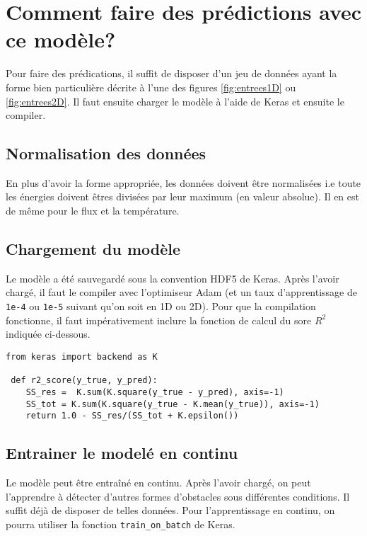 

\chapter{Comment faire des prédictions avec ce modèle?} %

\label{AppendixB} %
Pour faire des prédications, il suffit de disposer d'un jeu de données ayant la forme bien particulière décrite à l'une des figures \ref{fig:entrees1D} ou \ref{fig:entrees2D}. Il faut ensuite charger le modèle à l'aide de Keras et ensuite le compiler.

\section{Normalisation des données}
En plus d'avoir la forme appropriée, les données doivent être normalisées i.e toute les énergies doivent êtres divisées par leur maximum (en valeur absolue). Il en est de même pour le flux et la température.

\section{Chargement du modèle}
Le modèle a été sauvegardé sous la convention HDF5 de Keras. Après l'avoir chargé, il faut le compiler avec l'optimiseur Adam (et un taux d'apprentissage de \verb|1e-4| ou \verb|1e-5| suivant qu'on soit en 1D ou 2D). Pour que la compilation fonctionne, il faut impérativement inclure la fonction de calcul du sore $R^2$ indiquée ci-dessous.

\begin{verbatim}
from keras import backend as K

 def r2_score(y_true, y_pred):
    SS_res =  K.sum(K.square(y_true - y_pred), axis=-1) 
    SS_tot = K.sum(K.square(y_true - K.mean(y_true)), axis=-1)
    return 1.0 - SS_res/(SS_tot + K.epsilon())
\end{verbatim}


\section{Entrainer le modelé en continu}
Le modèle peut être entraîné en continu. Après l'avoir chargé, on peut l'apprendre à détecter d'autres formes d'obstacles sous différentes conditions. Il suffit déjà de disposer de telles données. Pour l'apprentissage en continu, on pourra utiliser la fonction \verb|train_on_batch| de Keras.

